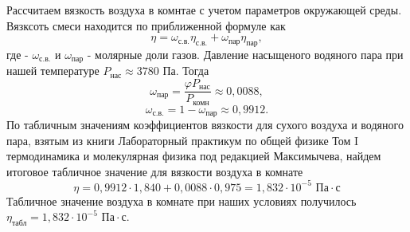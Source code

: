 \documentclass[a4paper]{article}
\begin{document}
\begin{enumerate}
Рассчитаем вязкость воздуха в комнтае с учетом параметров окружающей среды. Вязксоть смеси находится по приближенной формуле как
\begin{equation*}
	\eta = \omega_{\text{с.в.}}\eta_{\text{с.в.}} + \omega_{\text{пар}}\eta_{\text{пар}},
\end{equation*}
где - $\omega_{\text{с.в.}}$ и $\omega_{\text{пар}}$ - молярные доли газов. Давление насыщеного водяного пара при нашей температуре $P_{\text{нас}} \approx 3780$ Па. Тогда
\begin{equation*}
	\omega_{\text{пар}} = \frac{\varphi P_{\text{нас}}}{P_{\text{комн}}} \approx 0,0088,
\end{equation*}
\begin{equation*}
	\omega_{\text{с.в.}} = 1 - \omega_{\text{пар}} \approx 0,9912.
\end{equation*}
По табличным значениям коэффициентов вязкости для сухого воздуха и водяного пара, взятым из книги Лабораторный практикум по общей физике Том I термодинамика и молекулярная физика под редакцией Максимычева, найдем итоговое табличное значение для вязкости воздуха в комнате
\begin{equation*}
	\eta = 0,9912 \cdot 1,840 + 0,0088 \cdot 0,975 = 1,832 \cdot 10^{-5} \text{ Па} \cdot \text{с}
\end{equation*}
Табличное значение воздуха в комнате при наших условиях получилось $\eta_{\text{табл}} = 1,832 \cdot 10^{-5} \text{ Па} \cdot \text{с}$.


\end{enumerate}
\end{document}
